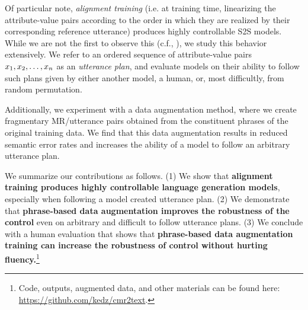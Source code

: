  Of particular note, \textit{alignment training} (i.e.  at training time, linearizing
the attribute-value pairs according to the order in which they are realized by
their corresponding reference utterance) produces highly controllable  S2S
models.  While we are not the first to observe this (c.f., \citet{nayak2017}),
we study this behavior extensively.  We refer to an ordered sequence of
attribute-value pairs $x_1, x_2, \ldots, x_n$ as an
\textit{utterance plan}, and evaluate models on their ability to follow such
plans given by either another model, a human, or, most difficultly, from
random permutation.

Additionally, we experiment with a data augmentation method, where we create
fragmentary MR/utterance pairs obtained from the constituent phrases of the
original training data.  We find that this data augmentation results in
reduced semantic error rates and increases the ability of a model to follow an
arbitrary utterance plan.

 We summarize our contributions as follows. (1) We show that \textbf{alignment training
produces highly controllable %
language generation models},
especially when following a model created utterance plan. (2) We demonstrate that \textbf{phrase-based
data augmentation improves the robustness of the control} even on arbitrary
and difficult to follow utterance plans. (3) We conclude with a human
evaluation that shows that \textbf{phrase-based data augmentation training
can increase the robustness of control without hurting fluency.}\footnote{
    Code, outputs, augmented data, and other materials 
    can be found here: \url{https://github.com/kedz/cmr2text}.}


